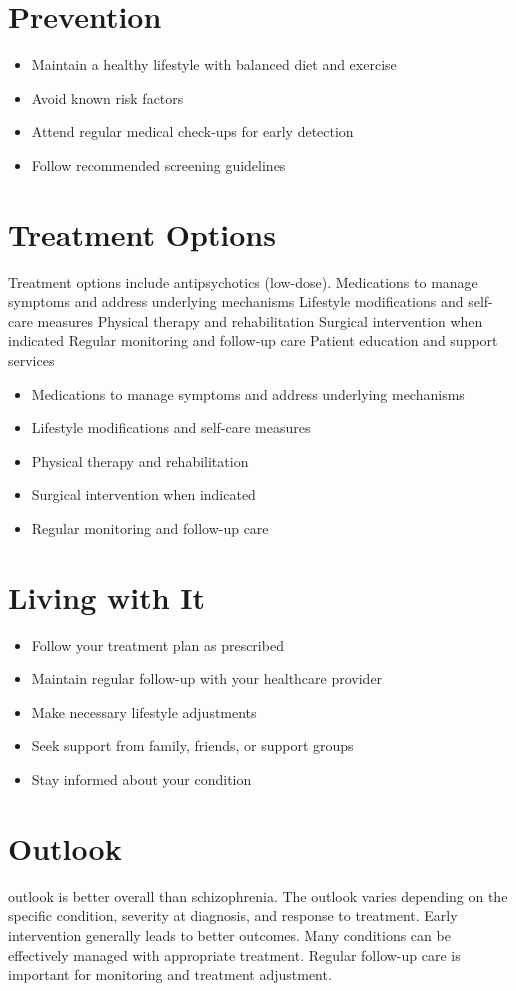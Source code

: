 \section{Prevention}
\begin{itemize}[noitemsep]
  \item Maintain a healthy lifestyle with balanced diet and exercise
  \item Avoid known risk factors
  \item Attend regular medical check-ups for early detection
  \item Follow recommended screening guidelines
\end{itemize}
\section{Treatment Options}
Treatment options include antipsychotics (low-dose). Medications to manage symptoms and address underlying mechanisms Lifestyle modifications and self-care measures Physical therapy and rehabilitation Surgical intervention when indicated Regular monitoring and follow-up care Patient education and support services

\begin{itemize}[noitemsep]
  \item Medications to manage symptoms and address underlying mechanisms
  \item Lifestyle modifications and self-care measures
  \item Physical therapy and rehabilitation
  \item Surgical intervention when indicated
  \item Regular monitoring and follow-up care
\end{itemize}
\section{Living with It}
\begin{itemize}[noitemsep]
  \item Follow your treatment plan as prescribed
  \item Maintain regular follow-up with your healthcare provider
  \item Make necessary lifestyle adjustments
  \item Seek support from family, friends, or support groups
  \item Stay informed about your condition
\end{itemize}
\section{Outlook}
outlook is better overall than schizophrenia. The outlook varies depending on the specific condition, severity at diagnosis, and response to treatment. Early intervention generally leads to better outcomes. Many conditions can be effectively managed with appropriate treatment. Regular follow-up care is important for monitoring and treatment adjustment.
